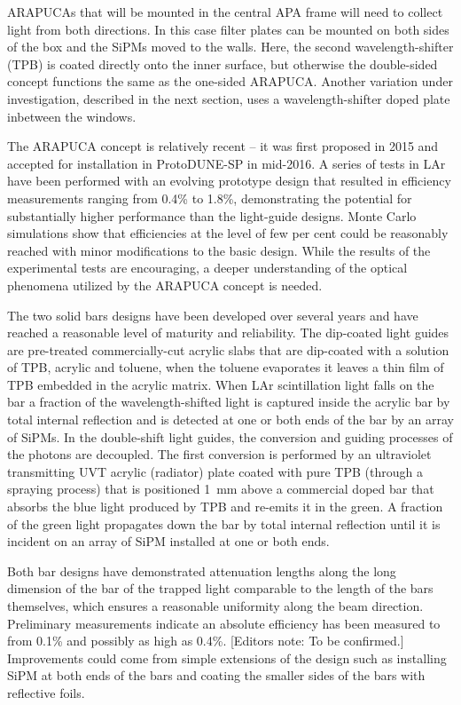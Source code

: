ARAPUCAs that will be mounted in the central APA frame will need to collect light from both directions. In this case filter plates can be mounted on both sides of the box and the SiPMs moved to the walls.  Here, the second wavelength-shifter (TPB) is coated directly onto the inner surface, but otherwise the double-sided concept functions the same as the one-sided ARAPUCA. 
Another variation under investigation, described in the next section, uses a wavelength-shifter doped plate inbetween the windows.

The ARAPUCA concept is relatively recent -- it was first proposed in 2015 and accepted for installation in ProtoDUNE-SP in mid-2016. A series of tests in LAr have been performed with an evolving prototype design that resulted in efficiency measurements ranging from  \num{0.4}\% to \num{1.8}\%, demonstrating the potential for substantially higher performance than the light-guide designs. Monte Carlo simulations show that efficiencies at the level of few per cent could be reasonably reached with minor modifications to the basic design. 
While the results of the experimental tests are encouraging, a deeper understanding of the optical phenomena utilized by the ARAPUCA concept is needed.

The two solid bars designs have been developed over several years and have reached a reasonable level of maturity and reliability. 
The dip-coated light guides are pre-treated commercially-cut acrylic slabs that are dip-coated with a solution of TPB, acrylic and toluene, when the toluene evaporates it leaves a thin film of TPB embedded in the acrylic matrix.  When LAr scintillation light falls on the bar a fraction of the wavelength-shifted light is captured inside the acrylic bar by total internal reflection and is detected at one or both ends of the bar by an array of SiPMs.
In the double-shift light guides, the conversion and guiding processes of the photons are decoupled. The first conversion is
performed by an ultraviolet transmitting UVT acrylic (radiator) plate coated with pure TPB (through a spraying process) that is positioned \SI{1}{mm} above a commercial doped bar that absorbs the blue light produced by TPB and re-emits it in the green.
 A fraction of the green light propagates down the bar by total internal reflection until it is incident on an
array of SiPM installed at one or both ends. 

Both bar designs have demonstrated attenuation lengths along the long dimension of the bar of the  trapped light comparable to the length of the bars themselves, which ensures a reasonable uniformity along the beam direction. Preliminary measurements indicate an absolute efficiency has been measured to from \num{0.1}\% and possibly as high as  \num{0.4}\%. [Editors note: To be confirmed.]
 Improvements could come from simple extensions of the design such as installing SiPM at both ends of the bars and coating the smaller sides of the bars with reflective foils. 

